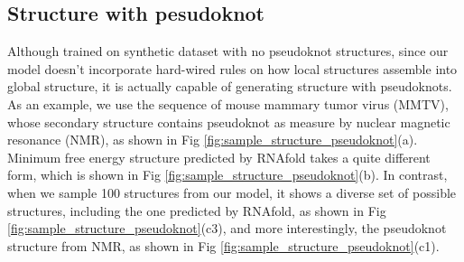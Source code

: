 \documentclass{article}
\begin{document}
%
%
%




\subsection{Structure with pesudoknot}

Although trained on synthetic dataset with no pseudoknot structures,
since our model doesn't incorporate hard-wired rules on how local structures assemble into global structure,
it is actually capable of generating structure with pseudoknots.
As an example, we use the sequence of mouse mammary tumor virus (MMTV), whose secondary structure
contains pseudoknot as measure by nuclear magnetic resonance (NMR), as shown in Fig \ref{fig:sample_structure_pseudoknot}(a).
Minimum free energy structure predicted by RNAfold takes a quite different form, which is shown in Fig \ref{fig:sample_structure_pseudoknot}(b).
In contrast, when we sample 100 structures from our model, it shows a diverse set of possible structures,
including the one predicted by RNAfold, as shown in Fig \ref{fig:sample_structure_pseudoknot}(c3),
and more interestingly, the pseudoknot structure from NMR, as shown in Fig \ref{fig:sample_structure_pseudoknot}(c1).

\end{document}
